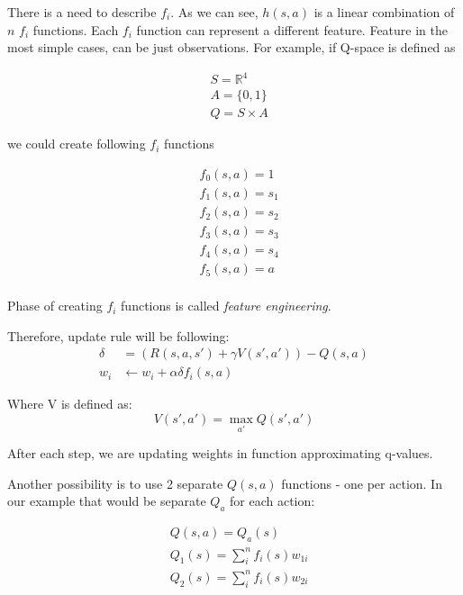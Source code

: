 \documentclass[12pt]{article}
\begin{document}
There is a need to describe $f_i$. As we can see, $h(s,a)$ is a linear combination of $n$ $f_i$ functions. Each $f_i$ function can represent a different feature. Feature in the most simple cases, can be just observations. For example, if Q-space is defined as 

\begin{equation}
\begin{aligned}
&S = \mathbb{R}^4 \\
&A = \{0, 1\} \\
&Q = S \times A
\end{aligned}
\end{equation}

we could create following $f_i$ functions

\begin{equation}
\begin{aligned}
&f_0(s, a) = 1 \\
&f_1(s, a) = s_1 \\
&f_2(s, a) = s_2 \\
&f_3(s, a) = s_3 \\
&f_4(s, a) = s_4 \\
&f_5(s, a) = a \\
\end{aligned}
\end{equation}


Phase of creating $f_i$ functions is called \emph{feature engineering}.

Therefore, update rule will be following:
\begin{equation}
\begin{aligned}
\delta&=(R(s,a,s')+\gamma V(s',a'))-Q(s,a) \\
w_i &\leftarrow w_i+\alpha \delta f_i (s,a)
\end{aligned}
\end{equation}

Where V is defined as:
\begin{equation}
V(s',a' )=\max_{a'}Q(s',a')
\end{equation}

After each step, we are updating weights in function approximating q-values.

Another possibility is to use 2 separate $Q(s,a)$ functions - one per action. In our example that would be separate $Q_a$ for each action:

\begin{equation}
\begin{aligned}
&Q(s, a) = Q_a(s) \\
&Q_1(s) = \sum_i^n f_i(s)w_{1i} \\
&Q_2(s) = \sum_i^n f_i(s)w_{2i} \\
\end{aligned}
\end{equation}
\end{document}
